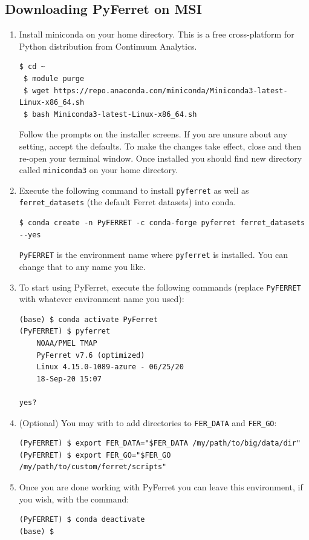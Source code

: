 \documentclass[a4paper]{article}
\def\noin{\noindent }
\begin{document}
\subsection{Downloading PyFerret on MSI}

\begin{enumerate}
\item Install miniconda on your home directory. This is a free cross-platform for Python distribution from Continuum Analytics. 
\begin{lstlisting}[style=DOS]
 $ cd ~
 $ module purge
 $ wget https://repo.anaconda.com/miniconda/Miniconda3-latest-Linux-x86_64.sh
 $ bash Miniconda3-latest-Linux-x86_64.sh
\end{lstlisting}
\noin Follow the prompts on the installer screens. If you are unsure about any setting, accept the defaults. To make the changes take effect, close and then re-open your terminal window. Once installed you should find new directory called \verb|miniconda3| on your home directory.

\item Execute the following command to install \verb|pyferret| as well as \verb|ferret_datasets| (the default Ferret datasets) into conda.
\begin{lstlisting}[style=DOS]
 $ conda create -n PyFERRET -c conda-forge pyferret ferret_datasets --yes
\end{lstlisting}
\noin \verb|PyFERRET| is the environment name where \verb|pyferret| is installed. You can change that to any name you like.

\item To start using PyFerret, execute the following commands (replace \verb|PyFERRET| with whatever environment name you used):
\begin{lstlisting}[style=DOS]
(base) $ conda activate PyFerret
(PyFERRET) $ pyferret
  	NOAA/PMEL TMAP
 	PyFerret v7.6 (optimized)
 	Linux 4.15.0-1089-azure - 06/25/20
 	18-Sep-20 15:07

yes?
\end{lstlisting}

\item (Optional) You may with to add directories to \verb|FER_DATA| and \verb|FER_GO|:
\begin{lstlisting}[style=DOS]
(PyFERRET) $ export FER_DATA="$FER_DATA /my/path/to/big/data/dir"
(PyFERRET) $ export FER_GO="$FER_GO /my/path/to/custom/ferret/scripts"
\end{lstlisting}

\item Once you are done working with PyFerret you can leave this environment, if you wish, with the command:
\begin{lstlisting}[style=DOS]
(PyFERRET) $ conda deactivate
(base) $
\end{lstlisting}

\end{enumerate}
\end{document}
